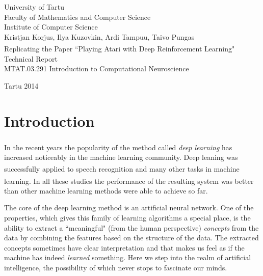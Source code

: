 \documentclass[a4paper,12pt]{article}
\begin{document}
\begin{center}
	{\Large
	University of Tartu\\
	Faculty of Mathematics and Computer Science\\
	Institute of Computer Science\\}
	\vspace{6cm}
	{\Large Kristjan Korjus, Ilya Kuzovkin, Ardi Tampuu, Taivo Pungas}\\
	\vspace{1.0cm}
	{\Huge Replicating the Paper ``Playing Atari with Deep Reinforcement Learning"\textsuperscript{\Large{\cite{mnih2013playing}}}}\\
	\vspace{0.5cm}
	{\Large Technical Report}\\
	\vspace{1.0cm}
	{\large MTAT.03.291 Introduction to Computational Neuroscience}
	
\end{center}
\vspace{9cm}
\begin{center}
	{\large Tartu 2014}
\end{center}
\thispagestyle{empty}
\pagebreak



%
%
\thispagestyle{empty}
\tableofcontents
\pagebreak



%
%
\section*{Introduction}
In the recent years the popularity of the method called \emph{deep learning}\textsuperscript{\cite{hinton2007learning}} has increased noticeably in the machine learning community. Deep leaning was successfully applied to speech recognition\textsuperscript{\cite{dahl2012context}} and many other tasks in machine learning\textsuperscript{\cite{deng2013new}}. In all these studies the performance of the resulting system was better than other machine learning methods were able to achieve so far.

The core of the deep learning method is an artificial neural network. One of the properties, which gives this family of learning algorithms a special place, is the ability to extract a ``meaningful" (from the human perspective) \emph{concepts} from the data by combining the features based on the structure of the data. The extracted concepts sometimes have clear interpretation and that makes us feel as if the machine has indeed \emph{learned} something. Here we step into the realm of artificial intelligence, the possibility of which never stops to fascinate our minds.
\end{document}
